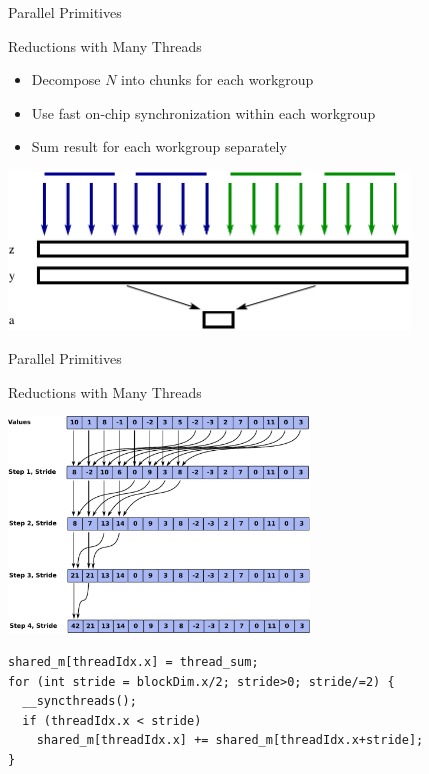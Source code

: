 \begin{frame}{Parallel Primitives}

\begin{block}{Reductions with Many Threads}
  \begin{itemize}
   \item Decompose $N$ into chunks for each workgroup
   \item Use fast on-chip synchronization within each workgroup
   \item Sum result for each workgroup separately
  \end{itemize}
\end{block}

\begin{center} \includegraphics[width=0.8\textwidth]{figures/inner-product-kernel} \end{center}


\end{frame}



\begin{frame}[fragile]{Parallel Primitives}

\begin{block}{Reductions with Many Threads}
  \vspace*{-.2cm}
\begin{center} 
  \includegraphics[width=0.6\textwidth]{figures/reduction}
\end{center}
\end{block}
  \vspace*{-.5cm}
\begin{center}
\begin{lstlisting}
shared_m[threadIdx.x] = thread_sum;
for (int stride = blockDim.x/2; stride>0; stride/=2) {
  __syncthreads();
  if (threadIdx.x < stride)
    shared_m[threadIdx.x] += shared_m[threadIdx.x+stride];
}
\end{lstlisting}
\end{center}

\end{frame}



